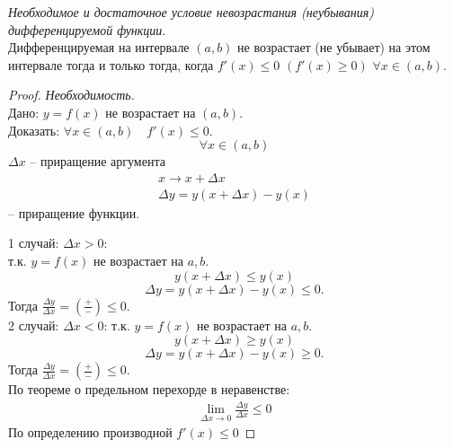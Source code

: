 \begin{theorem}
  \textit{Необходимое и достаточное условие невозрастания (неубывания) дифференцируемой функции}. \\
  Дифференцируемая на интервале $(a, b)$ не возрастает (не убывает) на этом интервале тогда и только тогда, когда  $f'(x) \le 0$ $\left( f'(x) \ge 0 \right)$ $\forall x \in (a, b)$.
\end{theorem}
\begin{proof}
  \textit{Необходимость}. \\
  Дано: $y=f(x)$ не возрастает на $(a, b)$. \\
  Доказать:  $\forall x \in (a, b) \quad f'(x) \le 0$. \[
  \forall x \in (a, b)
  \] 
  $\Delta x$ -- приращение аргумента
  \begin{gather*}
    x \to  x + \Delta x \\
    \Delta  y = y(x + \Delta x) - y(x)
  \end{gather*}
  -- приращение функции.

  1 случай: $\Delta x > 0$: \\
  т.к. $y = f(x)$ не возрастает на  $a, b$.  \[
  y(x + \Delta x) \le  y(x)
  \] \[
  \Delta  y = y(x + \Delta x) - y(x) \le 0.
  \] 
  Тогда $\frac{\Delta y}{\Delta x} = \left( \frac{+}{-} \right) \le 0$. \\

  2 случай: $\Delta  x < 0$: 
  т.к. $y = f(x)$ не возрастает на  $a, b$.  \[
  y(x + \Delta x) \ge y(x)
  \] \[
  \Delta  y = y(x + \Delta x) - y(x) \ge 0.
  \] 
  Тогда $\frac{\Delta y}{\Delta x} = \left( \frac{+}{-} \right) \le 0$. \\

  По теореме о предельном перехорде в неравенстве: 
  \begin{gather*}
    \lim_{\Delta x \to 0} \frac{\Delta y}{\Delta x} \le 0 
  \end{gather*}
  По определению производной $f'(x) \le 0$


\end{proof}
